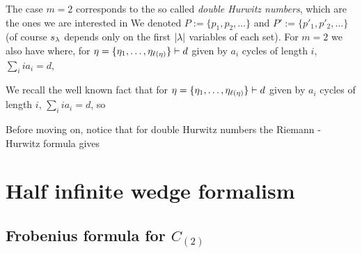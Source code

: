 \documentclass[10pt]{beamer}
\begin{document}
\begin{frame}

The case $m=2$ corresponds to the so called \emph{double Hurwitz numbers}, which are the ones we are interested in
We denoted $P:=\{p_1,p_2,\ldots\}$ and $P':=\{p'_1,p'_2,\ldots\}$ (of course $s_\lambda$ depends only on the first $|\lambda|$ variables of each set). For $m=2$ we also have
where, for $\eta=\{\eta_1,\ldots,\eta_{\ell(\eta)}\}\vdash d$ given by $a_i$ cycles of length $i$, $\sum_i ia_i=d$,

\end{frame}

\begin{frame}

We recall the well known fact that for $\eta=\{\eta_1,\ldots,\eta_{\ell(\eta)}\}\vdash d$ given by $a_i$ cycles of length $i$, $\sum_i ia_i=d$,
so

Before moving on, notice that for double Hurwitz numbers the Riemann - Hurwitz formula gives

\end{frame}

\section{Half infinite wedge formalism}

\subsection[Frobenius formula for $C\raisebox{-1pt}{\tiny(2)}$]{Frobenius formula for $C_{(2)}$}
\end{document}
